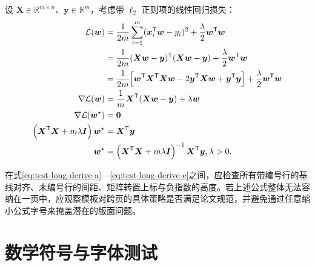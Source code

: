 设 $\boldsymbol{X}\in\mathbb{R}^{m\times n}$、$\boldsymbol{y}\in\mathbb{R}^{m}$，考虑带 $\ell_2$ 正则项的线性回归损失：
\begin{align}
  \mathcal{L}(\boldsymbol{w})
    &=\frac{1}{2m}\sum_{i=1}^{m}
        (\boldsymbol{x}_i^{\mathsf{T}}\boldsymbol{w}-y_i)^2
      +\frac{\lambda}{2}\boldsymbol{w}^{\mathsf{T}}\boldsymbol{w}
      \label{eq:test-long-derive-a}\\
    &=\frac{1}{2m}
        (\boldsymbol{X}\boldsymbol{w}-\boldsymbol{y})^{\mathsf{T}}
        (\boldsymbol{X}\boldsymbol{w}-\boldsymbol{y})
      +\frac{\lambda}{2}\boldsymbol{w}^{\mathsf{T}}\boldsymbol{w}
      \notag\\
    &=\frac{1}{2m}\Bigl[
        \boldsymbol{w}^{\mathsf{T}}\boldsymbol{X}^{\mathsf{T}}
          \boldsymbol{X}\boldsymbol{w}
        -2\boldsymbol{y}^{\mathsf{T}}\boldsymbol{X}\boldsymbol{w}
        +\boldsymbol{y}^{\mathsf{T}}\boldsymbol{y}
      \Bigr]
      +\frac{\lambda}{2}\boldsymbol{w}^{\mathsf{T}}\boldsymbol{w}
      \label{eq:test-long-derive-b}\\
  \nabla\mathcal{L}(\boldsymbol{w})
    &=\frac{1}{m}\boldsymbol{X}^{\mathsf{T}}
        (\boldsymbol{X}\boldsymbol{w}-\boldsymbol{y})
      +\lambda\boldsymbol{w}
      \label{eq:test-long-derive-c}\\
  \nabla\mathcal{L}(\boldsymbol{w}^{\star})&=\boldsymbol{0}
      \notag\\
  \left(\boldsymbol{X}^{\mathsf{T}}\boldsymbol{X}
       +m\lambda\boldsymbol{I}\right)\boldsymbol{w}^{\star}
    &=\boldsymbol{X}^{\mathsf{T}}\boldsymbol{y}
      \label{eq:test-long-derive-d}\\
  \boldsymbol{w}^{\star}
    &=\left(\boldsymbol{X}^{\mathsf{T}}\boldsymbol{X}
       +m\lambda\boldsymbol{I}\right)^{-1}
       \boldsymbol{X}^{\mathsf{T}}\boldsymbol{y},
      \quad \lambda>0.
      \label{eq:test-long-derive-e}
\end{align}

在式\eqref{eq:test-long-derive-a}—\eqref{eq:test-long-derive-e}之间，应检查所有带编号行的基线对齐、未编号行的间距、矩阵转置上标与负指数的高度。若上述公式整体无法容纳在一页中，应观察模板对跨页的具体策略是否满足论文规范，并避免通过任意缩小公式字号来掩盖潜在的版面问题。





\section{数学符号与字体测试}
\label{sec:formula-symbols}

